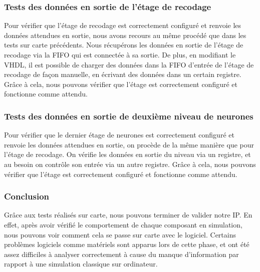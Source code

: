 \subsubsection{Tests des données en sortie de l'étage de recodage}

Pour vérifier que l'étage de recodage est correctement configuré et renvoie les
données attendues en sortie, nous avons recours au même procédé que dans les
tests sur carte précédents. Nous récupérons les données en sortie de l'étage
de recodage via la FIFO qui est connectée à sa sortie.
De plus, en modifiant le VHDL, il est possible de charger des données dans la
FIFO d'entrée de l'étage de recodage de façon manuelle, en écrivant des données
dans un certain registre. Grâce à cela, nous pouvons vérifier que l'étage
est correctement configuré et fonctionne comme attendu.

\subsubsection{Tests des données en sortie de deuxième niveau de neurones}

Pour vérifier que le dernier étage de neurones est correctement configuré et
renvoie les données attendues en sortie, on procède de la même manière que pour
l'étage de recodage.
On vérifie les données en sortie du niveau via un registre, et au besoin on
contrôle son entrée via un autre registre. Grâce à cela, nous pouvons vérifier
que l'étage est correctement configuré et fonctionne comme attendu.


\subsubsection{Conclusion}

Grâce aux tests réalisés sur carte, nous pouvons terminer de valider notre IP.
En effet, après avoir vérifié le comportement de chaque composant en simulation,
nous pouvons voir comment cela se passe sur carte avec le logiciel.
Certains problèmes logiciels comme matériels sont apparus lors de cette phase,
et ont été assez difficiles à analyser correctement à cause du manque
d'information par rapport à une simulation classique sur ordinateur.
